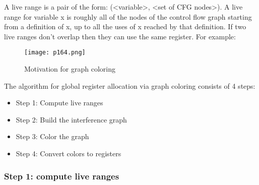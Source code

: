A live range is a pair of the form: (<variable>, <set of CFG nodes>). A live range for variable x is roughly all of the nodes of the control flow graph starting from a definition of x, up to all the uses of x reached by that definition.
If two live ranges don't overlap then they can use the same register. For example:


\begin{figure}[H]
	\centering
	\texttt{[image: p164.png]}
	\caption{Motivation for graph coloring}
	\label{fig:p164}
\end{figure}


The algorithm for global register allocation via graph coloring consists of 4 steps:
\begin{itemize}
	\item Step 1: Compute live ranges
	\item Step 2: Build the interference graph
	\item Step 3: Color the graph
	\item Step 4: Convert colors to registers
\end{itemize}


\subsubsection{Step 1: compute live ranges}

